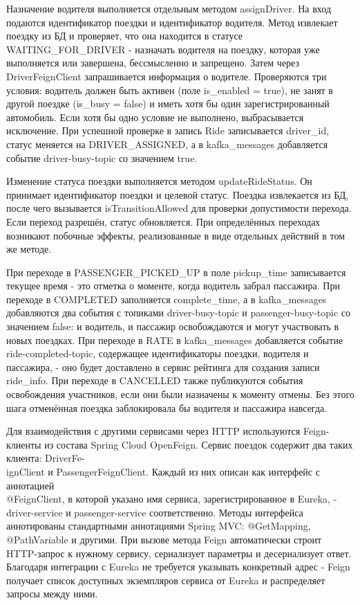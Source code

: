 {  \par \redline Назначение водителя выполняется отдельным методом assignDriver. На вход подаются идентификатор поездки и идентификатор водителя. Метод извлекает поездку из БД и проверяет, что она находится в статусе WAITING\_FOR\_DRIVER - назначать водителя на поездку, которая уже выполняется или завершена, бессмысленно и запрещено. Затем через DriverFeignClient запрашивается информация о водителе. Проверяются три условия: водитель должен быть активен (поле is\_enabled = true), не занят в другой поездке (is\_busy = false) и иметь хотя бы один зарегистрированный автомобиль. Если хотя бы одно условие не выполнено, выбрасывается исключение. При успешной проверке в запись Ride записывается driver\_id, статус меняется на DRIVER\_ASSIGNED, а в kafka\_messages добавляется событие driver-busy-topic со значением true.

  \par \redline Изменение статуса поездки выполняется методом updateRideStatus. Он принимает идентификатор поездки и целевой статус. Поездка извлекается из БД, после чего вызывается isTransitionAllowed для проверки допустимости перехода. Если переход разрешён, статус обновляется. При определённых переходах возникают побочные эффекты, реализованные в виде отдельных действий в том же методе.

  \par \redline При переходе в PASSENGER\_PICKED\_UP в поле pickup\_time записывается текущее время - это отметка о моменте, когда водитель забрал пассажира. При переходе в COMPLETED заполняется complete\_time, а в kafka\_messages добавляются два события с топиками driver-busy-topic и passenger-busy-topic со значением false: и водитель, и пассажир освобождаются и могут участвовать в новых поездках. При переходе в RATE в kafka\_messages добавляется событие ride-completed-topic, содержащее идентификаторы поездки, водителя и пассажира, - оно будет доставлено в сервис рейтинга для создания записи ride\_info. При переходе в CANCELLED также публикуются события освобождения участников, если они были назначены к моменту отмены. Без этого шага отменённая поездка заблокировала бы водителя и пассажира навсегда.

  \par \redline Для взаимодействия с другими сервисами через HTTP используются Feign-клиенты из состава Spring Cloud OpenFeign. Сервис поездок содержит два таких клиента: DriverFe-\\ignClient и PassengerFeignClient. Каждый из них описан как интерфейс с аннотацией \\@FeignClient, в которой указано имя сервиса, зарегистрированное в Eureka, - driver-service и passenger-service соответственно. Методы интерфейса аннотированы стандартными аннотациями Spring MVC: @GetMapping, @PathVariable и другими. При вызове метода Feign автоматически строит HTTP-запрос к нужному сервису, сериализует параметры и десериализует ответ. Благодаря интеграции с Eureka не требуется указывать конкретный адрес - Feign получает список доступных экземпляров сервиса от Eureka и распределяет запросы между ними.

}
